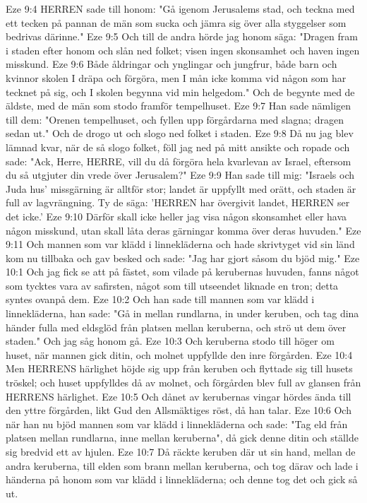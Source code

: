 Eze 9:4  HERREN sade till honom: "Gå igenom Jerusalems stad, och teckna med ett tecken på pannan de män som sucka och jämra sig över alla styggelser som bedrivas därinne."
Eze 9:5  Och till de andra hörde jag honom säga: "Dragen fram i staden efter honom och slån ned folket; visen ingen skonsamhet och haven ingen misskund.
Eze 9:6  Både åldringar och ynglingar och jungfrur, både barn och kvinnor skolen I dräpa och förgöra, men I mån icke komma vid någon som har tecknet på sig, och I skolen begynna vid min helgedom." Och de begynte med de äldste, med de män som stodo framför tempelhuset.
Eze 9:7  Han sade nämligen till dem: "Orenen tempelhuset, och fyllen upp förgårdarna med slagna; dragen sedan ut." Och de drogo ut och slogo ned folket i staden.
Eze 9:8  Då nu jag blev lämnad kvar, när de så slogo folket, föll jag ned på mitt ansikte och ropade och sade: "Ack, Herre, HERRE, vill du då förgöra hela kvarlevan av Israel, eftersom du så utgjuter din vrede över Jerusalem?"
Eze 9:9  Han sade till mig: "Israels och Juda hus' missgärning är alltför stor; landet är uppfyllt med orätt, och staden är full av lagvrängning. Ty de säga: 'HERREN har övergivit landet, HERREN ser det icke.'
Eze 9:10  Därför skall icke heller jag visa någon skonsamhet eller hava någon misskund, utan skall låta deras gärningar komma över deras huvuden."
Eze 9:11  Och mannen som var klädd i linnekläderna och hade skrivtyget vid sin länd kom nu tillbaka och gav besked och sade: "Jag har gjort såsom du bjöd mig."
Eze 10:1  Och jag fick se att på fästet, som vilade på kerubernas huvuden, fanns något som tycktes vara av safirsten, något som till utseendet liknade en tron; detta syntes ovanpå dem.
Eze 10:2  Och han sade till mannen som var klädd i linnekläderna, han sade: "Gå in mellan rundlarna, in under keruben, och tag dina händer fulla med eldsglöd från platsen mellan keruberna, och strö ut dem över staden." Och jag såg honom gå.
Eze 10:3  Och keruberna stodo till höger om huset, när mannen gick ditin, och molnet uppfyllde den inre förgården.
Eze 10:4  Men HERRENS härlighet höjde sig upp från keruben och flyttade sig till husets tröskel; och huset uppfylldes då av molnet, och förgården blev full av glansen från HERRENS härlighet.
Eze 10:5  Och dånet av kerubernas vingar hördes ända till den yttre förgården, likt Gud den Allsmäktiges röst, då han talar.
Eze 10:6  Och när han nu bjöd mannen som var klädd i linnekläderna och sade: "Tag eld från platsen mellan rundlarna, inne mellan keruberna", då gick denne ditin och ställde sig bredvid ett av hjulen.
Eze 10:7  Då räckte keruben där ut sin hand, mellan de andra keruberna, till elden som brann mellan keruberna, och tog därav och lade i händerna på honom som var klädd i linnekläderna; och denne tog det och gick så ut.
